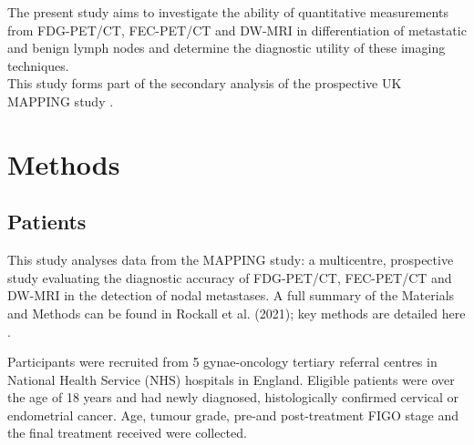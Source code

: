 \documentclass[sn-standardnature]{sn-jnl}
\theoremstyle{thmstyleone}%
\theoremstyle{thmstyletwo}%
\theoremstyle{thmstylethree}%
\begin{document}
The present study aims to investigate the ability of quantitative measurements from FDG-PET/CT, FEC-PET/CT and DW-MRI in differentiation of metastatic and benign lymph nodes and determine the diagnostic utility of these imaging techniques. \\

This study forms part of the secondary analysis of the prospective UK MAPPING study 
\cite{rockallDiagnosticAccuracyFECPET2021}. \\

\section{Methods}
    \subsection{Patients}
    This study analyses data from the MAPPING study: a multicentre, prospective study evaluating the diagnostic accuracy of FDG-PET/CT, FEC-PET/CT and DW-MRI in the detection of nodal metastases. A full summary of the Materials and Methods can be found in Rockall et al. (2021); key methods are detailed here \cite{rockallDiagnosticAccuracyFECPET2021}.

    Participants were recruited from 5 gynae-oncology tertiary referral centres in National Health Service (NHS) hospitals in England. Eligible patients were over the age of 18 years and had newly diagnosed, histologically confirmed cervical or endometrial cancer. %
    Age, tumour grade, pre-and post-treatment FIGO stage and the final treatment received were collected.
\end{document}
